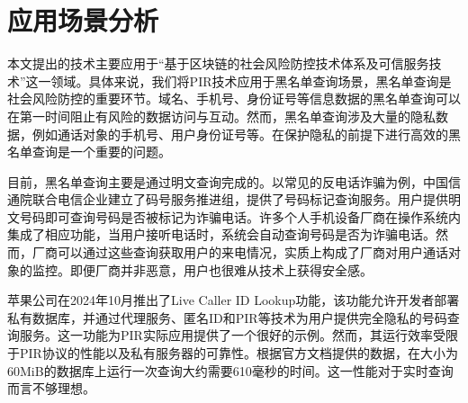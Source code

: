 \section{应用场景分析}

本文提出的技术主要应用于“基于区块链的社会风险防控技术体系及可信服务技术”这一领域。具体来说，我们将PIR技术应用于黑名单查询场景，黑名单查询是社会风险防控的重要环节。域名、手机号、身份证号等信息数据的黑名单查询可以在第一时间阻止有风险的数据访问与互动。然而，黑名单查询涉及大量的隐私数据，例如通话对象的手机号、用户身份证号等。在保护隐私的前提下进行高效的黑名单查询是一个重要的问题。

目前，黑名单查询主要是通过明文查询完成的。以常见的反电话诈骗为例，中国信通院联合电信企业建立了码号服务推进组\cite{e164}，提供了号码标记查询服务。用户提供明文号码即可查询号码是否被标记为诈骗电话。许多个人手机设备厂商在操作系统内集成了相应功能，当用户接听电话时，系统会自动查询号码是否为诈骗电话。然而，厂商可以通过这些查询获取用户的来电情况，实质上构成了厂商对用户通话对象的监控。即便厂商并非恶意，用户也很难从技术上获得安全感。

苹果公司在2024年10月推出了Live Caller ID Lookup功能\cite{apple_live_caller_id}，该功能允许开发者部署私有数据库，并通过代理服务、匿名ID和PIR等技术为用户提供完全隐私的号码查询服务。这一功能为PIR实际应用提供了一个很好的示例。然而，其运行效率受限于PIR协议的性能以及私有服务器的可靠性。根据官方文档提供的数据\cite{apple_parameter_tuning}，在大小为60MiB的数据库上运行一次查询大约需要610毫秒的时间。这一性能对于实时查询而言不够理想。
